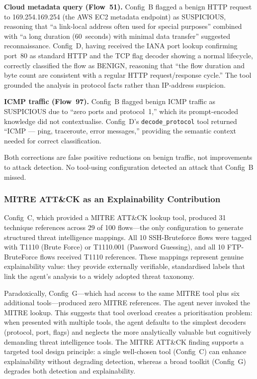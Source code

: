 \documentclass[../main.tex]{subfiles}
\begin{document}
\textbf{Cloud metadata query (Flow~51).} Config~B flagged a benign HTTP request to 169.254.169.254 (the AWS EC2 metadata endpoint) as SUSPICIOUS, reasoning that ``a link-local address often used for special purposes'' combined with ``a long duration (60~seconds) with minimal data transfer'' suggested reconnaissance. Config~D, having received the IANA port lookup confirming port~80 as standard HTTP and the TCP flag decoder showing a normal lifecycle, correctly classified the flow as BENIGN, reasoning that ``the flow duration and byte count are consistent with a regular HTTP request/response cycle.'' The tool grounded the analysis in protocol facts rather than IP-address suspicion.

\textbf{ICMP traffic (Flow~97).} Config~B flagged benign ICMP traffic as SUSPICIOUS due to ``zero ports and protocol~1,'' which its prompt-encoded knowledge did not contextualise. Config~D's \texttt{decode\_protocol} tool returned ``ICMP --- ping, traceroute, error messages,'' providing the semantic context needed for correct classification.

Both corrections are false positive reductions on benign traffic, not improvements to attack detection. No tool-using configuration detected an attack that Config~B missed.

\subsubsection{MITRE ATT\&CK as an Explainability Contribution}

Config~C, which provided a MITRE ATT\&CK lookup tool, produced 31 technique references across 29 of 100 flows---the only configuration to generate structured threat intelligence mappings. All 10 SSH-Bruteforce flows were tagged with T1110 (Brute Force) or T1110.001 (Password Guessing), and all 10 FTP-BruteForce flows received T1110 references. These mappings represent genuine explainability value: they provide externally verifiable, standardised labels that link the agent's analysis to a widely adopted threat taxonomy.

Paradoxically, Config~G---which had access to the same MITRE tool plus six additional tools---produced zero MITRE references. The agent never invoked the MITRE lookup. This suggests that tool overload creates a prioritisation problem: when presented with multiple tools, the agent defaults to the simplest decoders (protocol, port, flags) and neglects the more analytically valuable but cognitively demanding threat intelligence tools. The MITRE ATT\&CK finding supports a targeted tool design principle: a single well-chosen tool (Config~C) can enhance explainability without degrading detection, whereas a broad toolkit (Config~G) degrades both detection and explainability.
\end{document}
